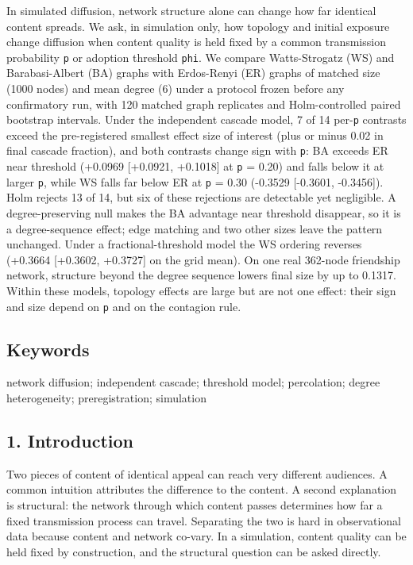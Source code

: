 \documentclass[
]{article}
\begin{document}
In simulated diffusion, network structure alone can change how far
identical content spreads. We ask, in simulation only, how topology and
initial exposure change diffusion when content quality is held fixed by
a common transmission probability \texttt{p} or adoption threshold
\texttt{phi}. We compare Watts-Strogatz (WS) and Barabasi-Albert (BA)
graphs with Erdos-Renyi (ER) graphs of matched size (1000 nodes) and
mean degree (6) under a protocol frozen before any confirmatory run,
with 120 matched graph replicates and Holm-controlled paired bootstrap
intervals. Under the independent cascade model, 7 of 14 per-\texttt{p}
contrasts exceed the pre-registered smallest effect size of interest
(plus or minus 0.02 in final cascade fraction), and both contrasts
change sign with \texttt{p}: BA exceeds ER near threshold (+0.0969
{[}+0.0921, +0.1018{]} at \texttt{p} = 0.20) and falls below it at
larger \texttt{p}, while WS falls far below ER at \texttt{p} = 0.30
(-0.3529 {[}-0.3601, -0.3456{]}). Holm rejects 13 of 14, but six of
these rejections are detectable yet negligible. A degree-preserving null
makes the BA advantage near threshold disappear, so it is a
degree-sequence effect; edge matching and two other sizes leave the
pattern unchanged. Under a fractional-threshold model the WS ordering
reverses (+0.3664 {[}+0.3602, +0.3727{]} on the grid mean). On one real
362-node friendship network, structure beyond the degree sequence lowers
final size by up to 0.1317. Within these models, topology effects are
large but are not one effect: their sign and size depend on \texttt{p}
and on the contagion rule.

\subsection{Keywords}\label{keywords}

network diffusion; independent cascade; threshold model; percolation;
degree heterogeneity; preregistration; simulation

\subsection{1. Introduction}\label{introduction}

Two pieces of content of identical appeal can reach very different
audiences. A common intuition attributes the difference to the content.
A second explanation is structural: the network through which content
passes determines how far a fixed transmission process can travel.
Separating the two is hard in observational data because content and
network co-vary. In a simulation, content quality can be held fixed by
construction, and the structural question can be asked directly.
\end{document}
